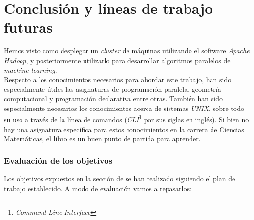 \chapter*{Conclusión y líneas de trabajo futuras}
Hemos visto como desplegar un \textit{cluster} de máquinas utilizando el software  \textit{Apache Hadoop}, 
y posteriormente utilizarlo para desarrollar algoritmos paralelos de \textit{machine learning}.\\
Respecto a los conocimientos necesarios para abordar este trabajo, han sido especialmente útiles las asignaturas
de programación paralela, geometría computacional y programación declarativa entre otras. También han sido especialmente
necesarios los conocimientos acerca de sistemas \textit{UNIX}, sobre todo su uso a través de la línea de comandos
(\textit{CLI}\footnote{\textit{Command Line Interface}} por sus siglas en inglés). Si bien no hay una asignatura
específica para estos conocimientos en la carrera de Ciencias Matemáticas, el libro \cite{unix_programming_environment}
es un buen punto de partida para aprender.

\subsection*{Evaluación de los objetivos}
Los objetivos expuestos en la sección de  
se han realizado siguiendo el plan de trabajo establecido. A modo de evaluación vamos a repasarlos:

